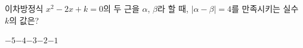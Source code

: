 이차방정식 $x^2-2x+k=0$의 두 근을 $\alpha$, $\beta$라 할 때, $|\alpha-\beta|=4$를 만족시키는 실수 $k$의 값은?
\begin{choices32}{$-5$}{$-4$}{$-3$}{$-2$}{$-1$}\end{choices32}
